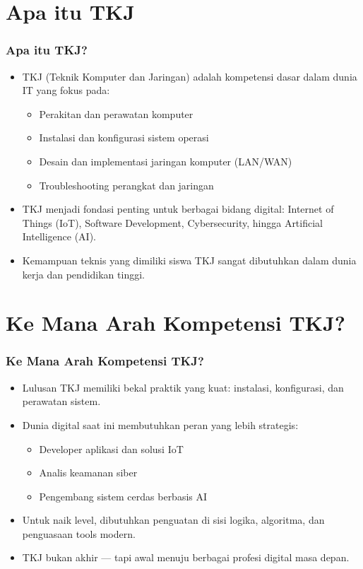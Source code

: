 \documentclass[aspectratio=169, table]{beamer}
\begin{document}
\section{Apa itu TKJ}
\begin{frame}
	\frametitle{Apa itu TKJ?}
	\vspace{10pt}
	\begin{itemize}
		\item TKJ (Teknik Komputer dan Jaringan) adalah kompetensi dasar dalam dunia IT yang fokus pada:
		\begin{itemize}
			\item Perakitan dan perawatan komputer
			\item Instalasi dan konfigurasi sistem operasi
			\item Desain dan implementasi jaringan komputer (LAN/WAN)
			\item Troubleshooting perangkat dan jaringan
		\end{itemize}
		\item TKJ menjadi fondasi penting untuk berbagai bidang digital: Internet of Things (IoT), Software Development, Cybersecurity, hingga Artificial Intelligence (AI).
		\item Kemampuan teknis yang dimiliki siswa TKJ sangat dibutuhkan dalam dunia kerja dan pendidikan tinggi.
	\end{itemize}
\end{frame}

\section{Ke Mana Arah Kompetensi TKJ?}
\begin{frame}
	\frametitle{Ke Mana Arah Kompetensi TKJ?}
	\vspace{10pt}
	\begin{itemize}
		\item Lulusan TKJ memiliki bekal praktik yang kuat: instalasi, konfigurasi, dan perawatan sistem.
		\item Dunia digital saat ini membutuhkan peran yang lebih strategis:
		\begin{itemize}
			\item Developer aplikasi dan solusi IoT
			\item Analis keamanan siber
			\item Pengembang sistem cerdas berbasis AI
		\end{itemize}
		\item Untuk naik level, dibutuhkan penguatan di sisi logika, algoritma, dan penguasaan tools modern.
		\item TKJ bukan akhir — tapi awal menuju berbagai profesi digital masa depan.
	\end{itemize}
\end{frame}
\end{document}
